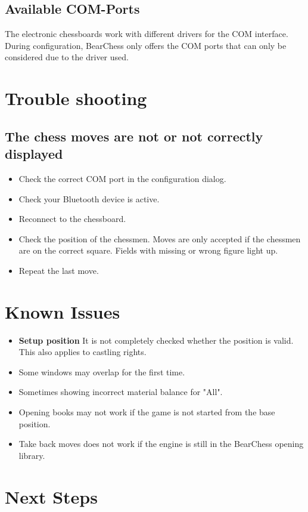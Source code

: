 \documentclass[11pt,a4paper]{article}
\begin{document}
\subsection{Available COM-Ports}
The electronic chessboards work with different drivers for the COM interface. During configuration, BearChess only offers the COM ports that can only be considered due to the driver used.

\section{Trouble shooting}

\subsection{The chess moves are not or not correctly displayed}
\begin{itemize}
	\item Check the correct COM port in the configuration dialog.
	\item Check your Bluetooth device is active.	
	\item Reconnect to the chessboard.	
	\item Check the position of the chessmen. Moves are only accepted if the chessmen are on the correct square. Fields with missing or wrong figure light up.
	\item Repeat the last move.
\end{itemize}


\section{Known Issues}
\begin{itemize}
    \item \textbf{Setup position} It is not completely checked whether the position is valid. This also applies to castling rights.
	\item Some windows may overlap for the first time.
	\item Sometimes showing incorrect material balance for "All".
	\item Opening books may not work if the game is not started from the base position.	
	\item Take back moves does not work if the engine is still in the BearChess opening library.
\end{itemize}



\section{Next Steps}
\end{document}
